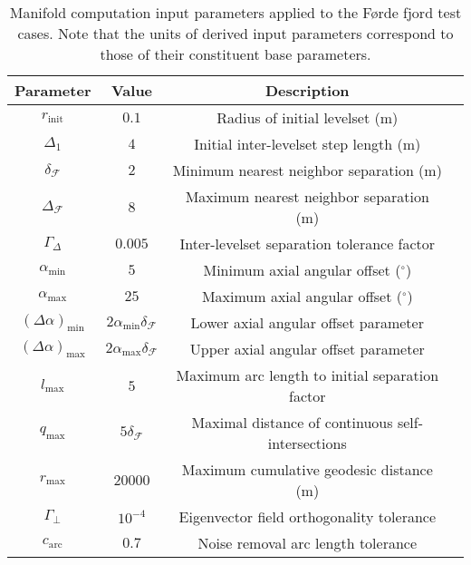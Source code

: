 \begin{table}[h!]
\begin{center}
\caption{Manifold computation input parameters applied to the Førde fjord test cases. Note that the units of derived input parameters correspond to those of their constituent base parameters.}\label{tab:fjord_manifold_parameters}
\bigskip
\begin{tabular}{cccc}
\hline
Parameter & Value & Description\\
\hline
$r_{\text{init}}$ & $0.1$ & Radius of initial levelset (m)\\
$\Delta_{1}$ & $4$ & Initial inter-levelset step length (m)\\
$\delta_{\mathcal{F}}$ & $2$ & Minimum nearest neighbor separation (m)\\
$\Delta_{\mathcal{F}}$ & $8$ & Maximum nearest neighbor separation (m)\\
$\Gamma_{\Delta}$ & $0.005$ & Inter-levelset separation tolerance factor\\
$\alpha_{\text{min}}$ & $5$ & Minimum axial angular offset (${^\circ}$)\\
$\alpha_{\text{max}}$ & $25$ & Maximum axial angular offset (${^\circ}$)\\
$(\Delta \alpha)_{\text{min}}$ & $2\alpha_{\text{min}}\delta_{\mathcal{F}}$ & Lower axial angular offset parameter\\
$(\Delta \alpha)_{\text{max}}$ & $2\alpha_{\text{max}}\delta_{\mathcal{F}}$ & Upper axial angular offset parameter\\
$l_{\text{max}}$ & $5$ & Maximum arc length to initial separation factor\\
$q_{\text{max}}$ & $5\delta_{\mathcal{F}}$ & Maximal distance of continuous self-intersections\\
$r_{\text{max}}$ & $20000$ & Maximum cumulative geodesic distance (m)\\
$\Gamma_{\perp}$ & $10^{-4}$ & Eigenvector field orthogonality tolerance\\
$c_{\text{arc}}$ & $0.7$ & Noise removal arc length tolerance\\

\hline
\end{tabular}
\end{center}
\end{table} 

